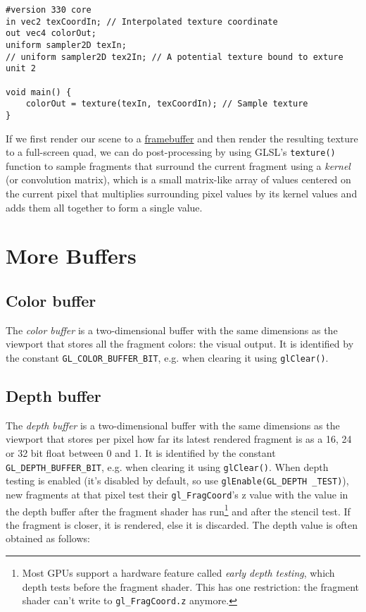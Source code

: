 \documentclass[8pt, table, xcdraw]{article}%
\begin{document}
\begin{lstlisting}
#version 330 core
in vec2 texCoordIn; // Interpolated texture coordinate
out vec4 colorOut;
uniform sampler2D texIn;
// uniform sampler2D tex2In; // A potential texture bound to exture unit 2

void main() {
    colorOut = texture(texIn, texCoordIn); // Sample texture
}
\end{lstlisting}

If we first render our scene to a \hyperref[framebuffer]{framebuffer} and then render the resulting texture to a full-screen quad, we can do post-processing by using GLSL's \lstinline{texture()} function to sample fragments that surround the current fragment using a \emph{kernel} (or convolution matrix), which is a small matrix-like array of values centered on the current pixel that multiplies surrounding pixel values by its kernel values and adds them all together to form a single value.

\section{More Buffers}

\subsection{Color buffer}

The \emph{color buffer} is a two-dimensional buffer with the same dimensions as the viewport that stores all the fragment colors: the visual output. It is identified by the constant \lstinline{GL_COLOR_BUFFER_BIT}, e.g. when clearing it using \lstinline{glClear()}.

\subsection{Depth buffer} \label{depth_buffer}

The \emph{depth buffer} is a two-dimensional buffer with the same dimensions as the viewport that stores per pixel how far its latest rendered fragment is as a 16, 24 or 32 bit float between 0 and 1. It is identified by the constant \lstinline{GL_DEPTH_BUFFER_BIT}, e.g. when clearing it using \lstinline{glClear()}. When depth testing is enabled (it's disabled by default, so use \lstinline{glEnable(GL_DEPTH _TEST)}), new fragments at that pixel test their \lstinline{gl_FragCoord}'s z value with the value in the depth buffer after the fragment shader has run\footnote{Most GPUs support a hardware feature called \emph{early depth testing}, which depth tests before the fragment shader. This has one restriction: the fragment shader can't write to \lstinline{gl_FragCoord.z} anymore.} and after the stencil test. If the fragment is closer, it is rendered, else it is discarded. The depth value is often obtained as follows:
\end{document}
